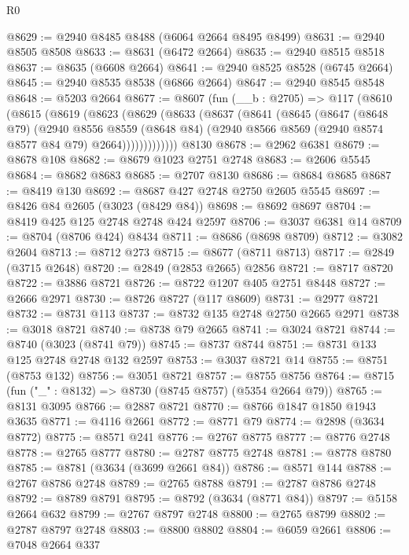 \begin{lexlean}{R0}
\begin{coremodule}
@8629 := @2940 @8485 @8488 (@6064 @2664 @8495 @8499)
@8631 := @2940 @8505 @8508
@8633 := @8631 (@6472 @2664)
@8635 := @2940 @8515 @8518
@8637 := @8635 (@6608 @2664)
@8641 := @2940 @8525 @8528 (@6745 @2664)
@8645 := @2940 @8535 @8538 (@6866 @2664)
@8647 := @2940 @8545 @8548
@8648 := @5203 @2664
@8677 := @8607
    (fun (__b : @2705) =>
    @117
      (@8610
        (@8615
          (@8619
            (@8623
              (@8629
                (@8633
                  (@8637
                    (@8641
                      (@8645
                        (@8647
                          (@8648 @79)
                          (@2940
                            @8556
                            @8559
                            (@8648 @84)
                            (@2940 @8566 @8569 (@2940 @8574 @8577 @84 @79) @2664)))))))))))))
    @8130
@8678 := @2962 @6381
@8679 := @8678 @108
@8682 := @8679 @1023 @2751 @2748
@8683 := @2606 @5545
@8684 := @8682 @8683
@8685 := @2707 @8130
@8686 := @8684 @8685
@8687 := @8419 @130
@8692 := @8687 @427 @2748 @2750 @2605 @5545
@8697 := @8426 @84 @2605 (@3023 (@8429 @84))
@8698 := @8692 @8697
@8704 := @8419 @425 @125 @2748 @2748 @424 @2597
@8706 := @3037 @6381 @14
@8709 := @8704 (@8706 @424) @8434
@8711 := @8686 (@8698 @8709)
@8712 := @3082 @2604
@8713 := @8712 @273
@8715 := @8677 (@8711 @8713)
@8717 := @2849 (@3715 @2648)
@8720 := @2849 (@2853 @2665) @2856
@8721 := @8717 @8720
@8722 := @3886 @8721
@8726 := @8722 @1207 @405 @2751 @8448
@8727 := @2666 @2971
@8730 := @8726 @8727 (@117 @8609)
@8731 := @2977 @8721
@8732 := @8731 @113
@8737 := @8732 @135 @2748 @2750 @2665 @2971
@8738 := @3018 @8721
@8740 := @8738 @79 @2665
@8741 := @3024 @8721
@8744 := @8740 (@3023 (@8741 @79))
@8745 := @8737 @8744
@8751 := @8731 @133 @125 @2748 @2748 @132 @2597
@8753 := @3037 @8721 @14
@8755 := @8751 (@8753 @132)
@8756 := @3051 @8721
@8757 := @8755 @8756
@8764 := @8715 (fun ("_" : @8132) => @8730 (@8745 @8757) (@5354 @2664 @79))
@8765 := @8131 @3095
@8766 := @2887 @8721
@8770 := @8766 @1847 @1850 @1943 @3635
@8771 := @4116 @2661
@8772 := @8771 @79
@8774 := @2898 (@3634 @8772)
@8775 := @8571 @241
@8776 := @2767 @8775
@8777 := @8776 @2748
@8778 := @2765 @8777
@8780 := @2787 @8775 @2748
@8781 := @8778 @8780
@8785 := @8781 (@3634 (@3699 @2661 @84))
@8786 := @8571 @144
@8788 := @2767 @8786 @2748
@8789 := @2765 @8788
@8791 := @2787 @8786 @2748
@8792 := @8789 @8791
@8795 := @8792 (@3634 (@8771 @84))
@8797 := @5158 @2664 @632
@8799 := @2767 @8797 @2748
@8800 := @2765 @8799
@8802 := @2787 @8797 @2748
@8803 := @8800 @8802
@8804 := @6059 @2661
@8806 := @7048 @2664 @337

\end{coremodule}
\end{lexlean}
